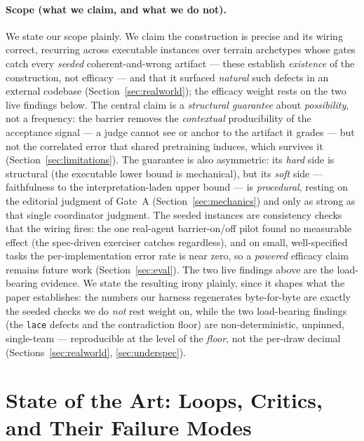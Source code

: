 \documentclass[11pt]{article}
\newcommand{\code}[1]{\texttt{#1}}
\begin{document}
\paragraph{Scope (what we claim, and what we do not).} We state our scope plainly. We claim the
construction is precise and its wiring correct, recurring across \ResNTerrains{} executable instances
over \ResNArchetypes{} terrain archetypes whose gates catch every \emph{seeded} coherent-and-wrong
artifact --- these establish \emph{existence} of the construction, not efficacy --- and that it surfaced
\ResRWBugsNum{} \emph{natural} such defects in an external codebase (Section~\ref{sec:realworld}); the
efficacy weight rests on the two live findings below. The central claim is a \emph{structural
guarantee} about \emph{possibility}, not a frequency: the barrier removes the \emph{contextual}
producibility of the acceptance signal --- a judge cannot see or anchor to the artifact it
grades --- but not the correlated error that shared pretraining induces, which survives it
(Section~\ref{sec:limitations}). The guarantee is also asymmetric: its \emph{hard} side is
structural (the executable lower bound is mechanical), but its \emph{soft} side --- faithfulness
to the interpretation-laden upper bound --- is \emph{procedural}, resting on the editorial
judgment of Gate~A (Section~\ref{sec:mechanics}) and only as strong as that single coordinator
judgment. The seeded instances are
consistency checks that the wiring fires: the one real-agent
barrier-on/off pilot found no measurable effect (the spec-driven exerciser catches regardless),
and on small, well-specified tasks the per-implementation error rate is near zero, so a
\emph{powered} efficacy claim remains future work (Section~\ref{sec:eval}). The two live findings above
are the load-bearing evidence. We state the resulting irony plainly, since it shapes what the paper
establishes: the numbers our harness regenerates byte-for-byte are exactly the seeded checks we do
\emph{not} rest weight on, while the two load-bearing findings (the \code{lace} defects and the
contradiction floor) are non-deterministic, unpinned, single-team --- reproducible at the level of the
\emph{floor}, not the per-draw decimal (Sections~\ref{sec:realworld}, \ref{sec:underspec}).

\section{State of the Art: Loops, Critics, and Their Failure Modes}
\label{sec:sota}
\end{document}
